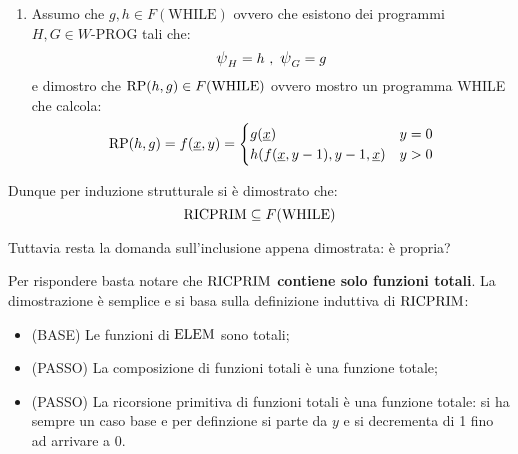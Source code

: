 \begin{enumerate}
\begin{minipage}{.9\textwidth}
\begin{algorithm}[H]
        \end{algorithm}
    \end{minipage}
    \item Assumo che $g,h\in F(\text{WHILE})$ ovvero che esistono dei programmi
    $H,G\in W\text{-PROG}$ tali che:
    $$ \semanticaWHILE_H=h \ ,\ \semanticaWHILE_{G}=g $$ 
    e dimostro che 
    $\text{RP}(h,g)\in F(\text{WHILE})$ ovvero mostro un programma WHILE che calcola:
    $$ \text{RP}(h,g) = f(\text{\underline{$x$}},y) = \begin{cases}
    g(\text{\underline{$x$}}) & y=0\\
    h(f(\text{\underline{$x$}},y-1),y-1,\text{\underline{$x$}}) & y>0
    \end{cases}$$
    \begin{center}
    \begin{minipage}{.85\textwidth}
    \begin{tcolorbox}[colback=white,sharp corners,boxrule=.2mm]
    \end{tcolorbox}
    \end{minipage}
    \end{center}\vspace{1em}
\end{enumerate}

Dunque per induzione strutturale si è dimostrato che:
$$ \text{RICPRIM} \subseteq F(\text{WHILE}) $$

Tuttavia resta la domanda sull'inclusione appena dimostrata: è propria?

Per rispondere basta notare che \textbf{$\text{RICPRIM}$ contiene solo funzioni totali}. La 
dimostrazione è semplice e si basa sulla definizione induttiva di $\text{RICPRIM}$:
\begin{itemize}
    \item (BASE) Le funzioni di $\text{ELEM}$ sono totali;
    \item (PASSO) La composizione di funzioni totali è una funzione totale;
    \item (PASSO) La ricorsione primitiva di funzioni totali è una funzione totale: si ha sempre
        un caso base e per definzione si parte da $y$ e si decrementa di 1 fino ad arrivare a 0.
\end{itemize}

